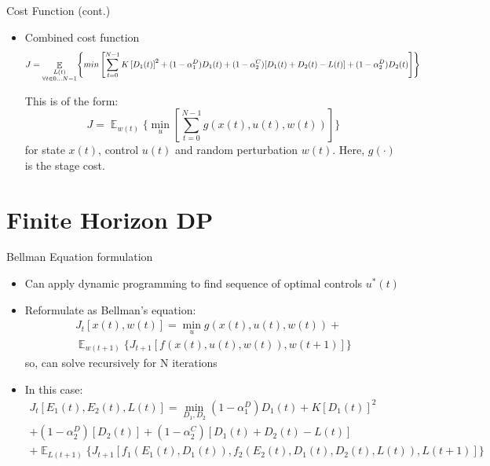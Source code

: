 \documentclass{beamer}
\DeclareMathOperator{\E}{\mathbb{E}}
\begin{document}
\begin{frame}{Cost Function (cont.)}
	\begin{itemize}
		\item Combined cost function
		\begin{equation}J=\mathop{\E}_{\substack{ L(t) \\ \forall t\in{0\dots N-1} }} \Biggl\{min\left[\sum_{t=0}^{N-1}K\left[D_{1}(t)\right]^{2} + (1-\alpha_{1}^{D})D_{1}(t)+\\
		(1-\alpha_{2}^{C})[D_{1}(t)+D_{2}(t)-L(t)]+
		(1-\alpha_{2}^{D})D_{2}(t)\right]\Biggr\}\end{equation}
		
		This is of the form:
		\begin{equation}J=\mathop{\E}_{w(t)} \Biggl\{\min_{u}\left[\sum_{t=0}^{N-1}g(x(t),u(t),w(t))\right]\Biggr\}\end{equation}
		for state $x(t)$, control $u(t)$ and random perturbation $w(t)$. Here, $g(\cdot)$ is the stage cost.
	\end{itemize}
\end{frame}

\section{Finite Horizon DP}
\begin{frame}{Bellman Equation formulation}
\begin{itemize}
	\item Can apply dynamic programming to find sequence of optimal controls $u^{*}(t)$
	\item Reformulate as Bellman’s equation:
	\begin{multline}
	J_{t}[x(t),w(t)]=\min_{u} g(x(t),u(t),w(t)) + \\\mathop{\E}_{w(t+1)} \{J_{t+1}[f(x(t),u(t),w(t)),w(t+1)]\}
	\end{multline}
	so, can solve recursively for N iterations
	\item In this case:
	\begin{multline}
	J_{t}[E_{1}(t),E_{2}(t),L(t)] = \min_{D_{1},D_{2}}
	(1-\alpha_{1}^{D})D_{1}(t) 
	+ K[D_{1}(t)]^{2}\\
	+(1-\alpha_{2}^{D})[D_{2}(t)]	  +(1-\alpha_{2}^{C})[D_{1}(t)+D_{2}(t)-L(t)]\\
	+\mathop{\E}_{L(t+1)}\{J_{t+1}[f_{1}(E_{1}(t),D_{1}(t)), f_{2}(E_{2}(t),D_{1}(t),D_{2}(t),L(t)), L(t+1)]\}
	\end{multline}
\end{itemize}
\end{frame}
\end{document}
